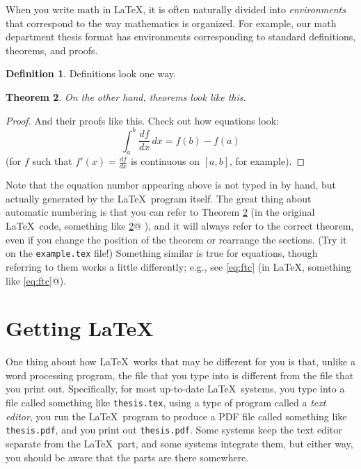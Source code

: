\documentclass[modernstyle,12pt]{sjsuthesis}
\newtheorem{thm}{Theorem}[section]
\theoremstyle{definition}
\newtheorem{defn}[thm]{Definition}
\begin{document}
When you write math in \LaTeX, it is often naturally divided into {\it
  environments\/} that correspond to the way mathematics is organized.
For example, our math department thesis format has environments
corresponding to standard definitions, theorems, and proofs.

\begin{defn}
Definitions look one way.
\end{defn}

\begin{thm}\label{thm:sample}
On the other hand, theorems look like this.
\end{thm}

\begin{proof}
And their proofs like this.  Check out how equations look:
\begin{equation}\label{eq:ftc}
\int_a^b \dfrac{df}{dx} \,dx = f(b)-f(a)
\end{equation}
(for $f$ such that $f'(x)=\frac{df}{dx}$ is continuous on $[a,b]$, for
example).
\end{proof}

Note that the equation number appearing above is not typed in by hand,
but actually generated by the \LaTeX\ program itself.  The great thing
about automatic numbering is that you can refer to Theorem
\ref{thm:sample} (in the original \LaTeX\ code, something like
%
\verb@Theorem \ref{thm:sample}@%
%
), and it will always refer to the correct theorem, even if you change
the position of the theorem or rearrange the sections.  (Try it on the
{\tt example.tex\/} file!)  Something similar is true for equations,
though referring to them works a little differently; e.g., see
\eqref{eq:ftc} (in \LaTeX, something like \verb@\eqref{eq:ftc}@).



\section{Getting \LaTeX}

One thing about how \LaTeX\ works that may be different for you is
that, unlike a word processing program, the file that you type into is
different from the file that you print out.  Specifically, for most
up-to-date \LaTeX\ systems, you type into a file called something like
{\tt thesis.tex}, using a type of program called a {\it text editor},
you run the \LaTeX\ program to produce a PDF file called something
like {\tt thesis.pdf}, and you print out {\tt thesis.pdf}.  Some
systems keep the text editor separate from the \LaTeX\ part, and some
systems integrate them, but either way, you should be aware that the
parts are there somewhere.
\end{document}
